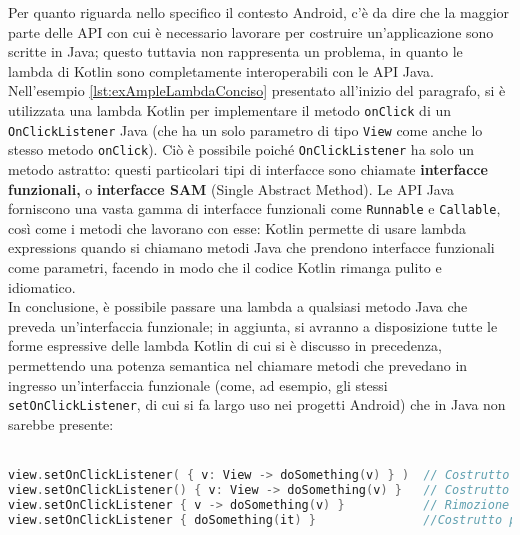 Per quanto riguarda nello specifico il contesto Android, c'è da dire che la maggior parte delle API con cui è necessario lavorare per costruire un'applicazione sono scritte in Java; questo tuttavia non rappresenta un problema, in quanto le lambda di Kotlin sono completamente interoperabili con le API Java. Nell'esempio \ref{lst:exAmpleLambdaConciso} presentato all'inizio del paragrafo, si è utilizzata una lambda Kotlin per implementare il metodo \texttt{onClick} di un \texttt{OnClickListener} Java (che ha un solo parametro di tipo \texttt{View} come anche lo stesso metodo \texttt{onClick}).  Ciò è possibile poiché \texttt{OnClickListener} ha solo un metodo astratto: questi particolari tipi di interfacce sono chiamate {\bfseries interfacce funzionali,} o {\bfseries interfacce SAM} (Single Abstract Method). Le API Java forniscono una vasta gamma di interfacce funzionali come \texttt{Runnable} e \texttt{Callable}, così come i metodi che lavorano con esse: Kotlin permette di usare lambda expressions quando si chiamano metodi Java che prendono interfacce funzionali come parametri, facendo in modo che il codice Kotlin rimanga pulito e idiomatico.\\
In conclusione, è possibile passare una lambda a qualsiasi metodo Java che preveda un'interfaccia funzionale; in aggiunta, si avranno a disposizione tutte le forme espressive delle lambda Kotlin di cui si è discusso in precedenza, permettendo una potenza semantica nel chiamare metodi che prevedano in ingresso un'interfaccia funzionale (come, ad esempio, gli stessi \texttt{setOnClickListener}, di cui si fa largo uso nei progetti Android) che in Java non sarebbe presente:\\
\\

\begin{lstlisting}[caption={Definizione di OnClickListener con le varie forme espressive di Kotlin}, captionpos=b, label={lst:exAmpleLambdaList}, language=Kotlin]
view.setOnClickListener( { v: View -> doSomething(v) } )  // Costrutto verboso
view.setOnClickListener() { v: View -> doSomething(v) }   // Costrutto con parentesi tonde
view.setOnClickListener { v -> doSomething(v) }           // Rimozione di parentesi e tipo
view.setOnClickListener { doSomething(it) }               //Costrutto pulito utilizzando "it"
\end{lstlisting}

